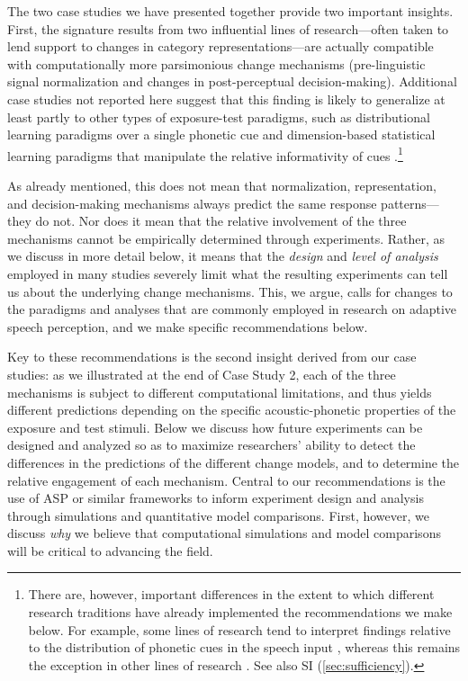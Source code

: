 \documentclass[
  11pt,
  man,floatsintext]{apa6}
\begin{document}
The two case studies we have presented together provide two important insights. First, the signature results from two influential lines of research---often taken to lend support to changes in category representations---are actually compatible with computationally more parsimonious change mechanisms (pre-linguistic signal normalization and changes in post-perceptual decision-making). Additional case studies not reported here suggest that this finding is likely to generalize at least partly to other types of exposure-test paradigms, such as distributional learning paradigms over a single phonetic cue \autocite{clayards2008,kleinschmidt-jaeger2016cogsci} and dimension-based statistical learning paradigms that manipulate the relative informativity of cues \autocite{idemaru-holt2011,idemaru-holt2020}.\footnote{There are, however, important differences in the extent to which different research traditions have already implemented the recommendations we make below. For example, some lines of research tend to interpret findings relative to the distribution of phonetic cues in the speech input \autocites[e.g., studies on distributional learning,][]{bejjanki2011,clayards2008,kleinschmidt-jaeger2016pbr,malone2021}[studies on dimension-based statistical learning,][]{idemaru-holt2020,schertz2015}[for review, see][]{schertz-clare2020}, whereas this remains the exception in other lines of research \autocites[but see, e.g.,][]{hitczenko-feldman2016}[ for accent adaptation]{tan2021}{drouin2016}[ for perceptual recalibration]{theodore-monto2019}. See also SI (\ref{sec:sufficiency}).}

As already mentioned, this does not mean that normalization, representation, and decision-making mechanisms always predict the same response patterns---they do not. Nor does it mean that the relative involvement of the three mechanisms cannot be empirically determined through experiments. Rather, as we discuss in more detail below, it means that the \emph{design} and \emph{level of analysis} employed in many studies severely limit what the resulting experiments can tell us about the underlying change mechanisms. This, we argue, calls for changes to the paradigms and analyses that are commonly employed in research on adaptive speech perception, and we make specific recommendations below.

Key to these recommendations is the second insight derived from our case studies: as we illustrated at the end of Case Study 2, each of the three mechanisms is subject to different computational limitations, and thus yields different predictions depending on the specific acoustic-phonetic properties of the exposure and test stimuli. Below we discuss how future experiments can be designed and analyzed so as to maximize researchers' ability to detect the differences in the predictions of the different change models, and to determine the relative engagement of each mechanism. Central to our recommendations is the use of ASP or similar frameworks to inform experiment design and analysis through simulations and quantitative model comparisons. First, however, we discuss \emph{why} we believe that computational simulations and model comparisons will be critical to advancing the field.
\end{document}
